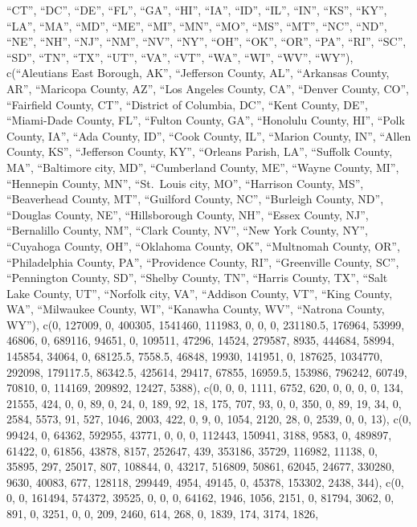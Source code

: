 \documentclass[
]{article}
\begin{document}
``CT'', ``DC'', ``DE'', ``FL'', ``GA'', ``HI'', ``IA'', ``ID'', ``IL'',
``IN'', ``KS'', ``KY'', ``LA'', ``MA'', ``MD'', ``ME'', ``MI'', ``MN'',
``MO'', ``MS'', ``MT'', ``NC'', ``ND'', ``NE'', ``NH'', ``NJ'', ``NM'',
``NV'', ``NY'', ``OH'', ``OK'', ``OR'', ``PA'', ``RI'', ``SC'', ``SD'',
``TN'', ``TX'', ``UT'', ``VA'', ``VT'', ``WA'', ``WI'', ``WV'', ``WY''),
c(``Aleutians East Borough, AK'', ``Jefferson County, AL'', ``Arkansas
County, AR'', ``Maricopa County, AZ'', ``Los Angeles County, CA'',
``Denver County, CO'', ``Fairfield County, CT'', ``District of Columbia,
DC'', ``Kent County, DE'', ``Miami-Dade County, FL'', ``Fulton County,
GA'', ``Honolulu County, HI'', ``Polk County, IA'', ``Ada County, ID'',
``Cook County, IL'', ``Marion County, IN'', ``Allen County, KS'',
``Jefferson County, KY'', ``Orleans Parish, LA'', ``Suffolk County,
MA'', ``Baltimore city, MD'', ``Cumberland County, ME'', ``Wayne County,
MI'', ``Hennepin County, MN'', ``St.~Louis city, MO'', ``Harrison
County, MS'', ``Beaverhead County, MT'', ``Guilford County, NC'',
``Burleigh County, ND'', ``Douglas County, NE'', ``Hillsborough County,
NH'', ``Essex County, NJ'', ``Bernalillo County, NM'', ``Clark County,
NV'', ``New York County, NY'', ``Cuyahoga County, OH'', ``Oklahoma
County, OK'', ``Multnomah County, OR'', ``Philadelphia County, PA'',
``Providence County, RI'', ``Greenville County, SC'', ``Pennington
County, SD'', ``Shelby County, TN'', ``Harris County, TX'', ``Salt Lake
County, UT'', ``Norfolk city, VA'', ``Addison County, VT'', ``King
County, WA'', ``Milwaukee County, WI'', ``Kanawha County, WV'',
``Natrona County, WY''), c(0, 127009, 0, 400305, 1541460, 111983, 0, 0,
0, 231180.5, 176964, 53999, 46806, 0, 689116, 94651, 0, 109511, 47296,
14524, 279587, 8935, 444684, 58994, 145854, 34064, 0, 68125.5, 7558.5,
46848, 19930, 141951, 0, 187625, 1034770, 292098, 179117.5, 86342.5,
425614, 29417, 67855, 16959.5, 153986, 796242, 60749, 70810, 0, 114169,
209892, 12427, 5388), c(0, 0, 0, 1111, 6752, 620, 0, 0, 0, 0, 134,
21555, 424, 0, 0, 89, 0, 24, 0, 189, 92, 18, 175, 707, 93, 0, 0, 350, 0,
89, 19, 34, 0, 2584, 5573, 91, 527, 1046, 2003, 422, 0, 9, 0, 1054,
2120, 28, 0, 2539, 0, 0, 13), c(0, 99424, 0, 64362, 592955, 43771, 0, 0,
0, 112443, 150941, 3188, 9583, 0, 489897, 61422, 0, 61856, 43878, 8157,
252647, 439, 353186, 35729, 116982, 11138, 0, 35895, 297, 25017, 807,
108844, 0, 43217, 516809, 50861, 62045, 24677, 330280, 9630, 40083, 677,
128118, 299449, 4954, 49145, 0, 45378, 153302, 2438, 344), c(0, 0, 0,
161494, 574372, 39525, 0, 0, 0, 64162, 1946, 1056, 2151, 0, 81794, 3062,
0, 891, 0, 3251, 0, 0, 209, 2460, 614, 268, 0, 1839, 174, 3174, 1826,
\end{document}
